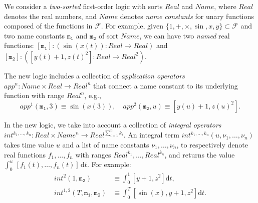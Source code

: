 We consider a \emph{two-sorted} first-order logic with sorts $\mathit{Real}$ and $\mathit{Name}$,
where $\mathit{Real}$ denotes the real numbers,
and $\mathit{Name}$ denotes \emph{name constants} 
for unary functions composed of the functions in $\mathcal{F}$.
For example, given $\{1, +, \times, \sin, x, y\} \subset \mathcal{F}$
and two name constants $\mathtt{m_1}$ and $\mathtt{m_2}$ of sort $\mathit{Name}$,
we can have two \emph{named} real functions:
$[\mathtt{m_1}]:
(\sin(x(t)) :\mathit{Real} \to \mathit{Real})$
and
$[\mathtt{m_2}]:
([y(t) + 1, z(t)^2] :  \mathit{Real} \to \mathit{Real}^2)$.


The new logic 
includes
a collection of \emph{application operators} $\mathit{app}^n : \mathit{Name} \times \mathit{Real} \to \mathit{Real}^n$
that connect a name constant to its underlying function with range $\mathit{Real}^n$, e.g.,
\[
\mathit{app}^1(\mathtt{m_1}, 3) \equiv \sin(x(3)),
\quad
\mathit{app}^2(\mathtt{m_2}, u) \equiv [y(u) + 1,z(u)^2].
\]
 

In the new logic,  we take into account
a collection of \emph{integral operators} 
$\mathit{int}^{k_1,\ldots,k_n} :  \mathit{Real} \times \mathit{Name}^n  \to \mathit{Real}^{\sum_{i=1}^n k_i}$.
An integral term
$\mathit{int}^{k_1,\ldots,k_n}(u,\nu_1,\ldots,\nu_n)$
takes time value $u$
and a list of name constants $\nu_1,\ldots,\nu_n$,
to respectively denote real functions $f_1,\ldots,f_n$ with ranges $\mathit{Real}^{k_1},\ldots,\mathit{Real}^{k_n}$,
and returns the value $\int_0^u \, [f_1(t),\ldots,f_n(t)] \,\mathrm{d}t$.  
For example:
\begin{align*}
\mathit{int}^{2}(1, \mathtt{m_2}) 
&\equiv
\int_0^1
[y + 1, z^2]
\mathrm{d}t,
\\
\mathit{int}^{1,2}(T,\mathtt{m_1},\mathtt{m_2}) 
&\equiv
\int_0^T
[\sin(x),y + 1,z^2]
\mathrm{d}t.
\end{align*}









